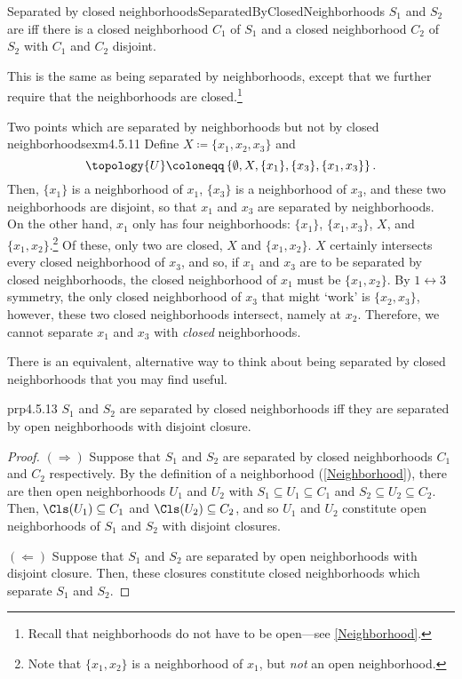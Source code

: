 \begin{dfn}{Separated by closed neighborhoods}{SeparatedByClosedNeighborhoods}
$S_1$ and $S_2$ are  iff there is a closed neighborhood $C_1$ of $S_1$ and a closed neighborhood $C_2$ of $S_2$ with $C_1$ and $C_2$ disjoint.
\begin{rmk}
This is the same as being separated by neighborhoods, except that we further require that the neighborhoods are closed.\footnote{Recall that neighborhoods do not have to be open---see \cref{Neighborhood}.}
\end{rmk}
\end{dfn}
\begin{exm}{Two points which are separated by neighborhoods but not by closed neighborhoods}{exm4.5.11}
Define $X\coloneqq \{ x_1,x_2,x_3\}$ and
\begin{equation}
\topology{U}\coloneqq \left\{ \emptyset ,X,\{ x_1\} ,\{ x_3\} ,\{ x_1,x_3\} \right\} .
\end{equation}
Then, $\{ x_1\}$ is a neighborhood of $x_1$, $\{ x_3\}$ is a neighborhood of $x_3$, and these two neighborhoods are disjoint, so that $x_1$ and $x_3$ are separated by neighborhoods.  On the other hand, $x_1$ only has four neighborhoods:  $\{ x_1\}$, $\{ x_1,x_3\}$, $X$, and $\{ x_1,x_2\}$.\footnote{Note that $\{ x_1,x_2\}$ is a neighborhood of $x_1$, but \emph{not} an open neighborhood.}  Of these, only two are closed, $X$ and $\{ x_1,x_2\}$.  $X$ certainly intersects every closed neighborhood of $x_3$, and so, if $x_1$ and $x_3$ are to be separated by closed neighborhoods, the closed neighborhood of $x_1$ must be $\{ x_1,x_2\}$.  By $1\leftrightarrow 3$ symmetry, the only closed neighborhood of $x_3$ that might `work' is $\{ x_2,x_3\}$, however, these two closed neighborhoods intersect, namely at $x_2$.  Therefore, we cannot separate $x_1$ and $x_3$ with \emph{closed} neighborhoods.
\end{exm}
There is an equivalent, alternative way to think about being separated by closed neighborhoods that you may find useful.
\begin{prp}{}{prp4.5.13}
$S_1$ and $S_2$ are separated by closed neighborhoods iff they are separated by open neighborhoods with disjoint closure.
\begin{proof}
$(\Rightarrow )$ Suppose that $S_1$ and $S_2$ are separated by closed neighborhoods $C_1$ and $C_2$ respectively.  By the definition of a neighborhood (\cref{Neighborhood}), there are then open neighborhoods $U_1$ and $U_2$ with $S_1\subseteq U_1\subseteq C_1$ and $S_2\subseteq U_2\subseteq C_2$.  Then, $\Cls (U_1)\subseteq C_1$ and $\Cls (U_2)\subseteq C_2$, and so $U_1$ and $U_2$ constitute open neighborhoods of $S_1$ and $S_2$ with disjoint closures.

\blankline
\noindent
$(\Leftarrow )$ Suppose that $S_1$ and $S_2$ are separated by open neighborhoods with disjoint closure.  Then, these closures constitute closed neighborhoods which separate $S_1$ and $S_2$.
\end{proof}
\end{prp}

